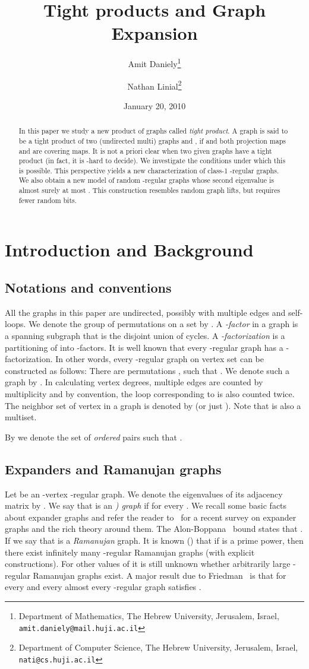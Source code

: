 \documentclass[12pt]{article}
\title{Tight products and Graph Expansion}
\author{
  Amit Daniely\thanks{Department of Mathematics,
    The Hebrew University, Jerusalem, Israel,
    {\tt amit.daniely@mail.huji.ac.il}}
\and
  Nathan Linial\thanks{Department of Computer Science,
    The Hebrew University, Jerusalem, Israel,
    {\tt nati@cs.huji.ac.il}}
}
\date{January 20, 2010}
\newtheorem{open question}[theorem]{Open question}
\begin{document}
 
\maketitle
\begin{abstract}
In this paper we study a new product of graphs called
{\em tight product}. A graph  is said to be a tight product of
two (undirected multi) graphs  and ,
if  and both projection maps 
and  are covering maps. It is not a priori
clear when two given graphs have a tight product (in fact, it
is -hard to decide). We investigate the conditions under which this
is possible. This perspective yields a new
characterization of class-1 -regular graphs.
We also obtain a new model of random -regular graphs whose
second eigenvalue is almost surely at most .
This construction resembles random graph lifts,
but requires fewer random bits.
\end{abstract}


\section{Introduction and Background}
\subsection{Notations and conventions}
All the graphs in this paper are undirected, possibly with
multiple edges and
self-loops. We denote the group of permutations on a set 
by . A {\em -factor} in a graph  is a spanning subgraph
that is the disjoint union of cycles. A {\em -factorization}
is a partitioning of  into -factors. It is well known
\cite{Diestel} that every -regular graph  has a -factorization.
In other words, every -regular graph  on vertex set  can be
constructed as follows: There are  permutations ,
such that .
We denote such a graph by . In calculating vertex degrees, multiple
edges are counted by multiplicity and by convention, the
loop corresponding to  is also counted twice. The neighbor set of
vertex  in a graph  is denoted by  (or just ). Note that  is also a multiset.

By  we denote the set of {\em ordered} pairs  such that .
\subsection{Expanders and Ramanujan graphs}
Let  be an -vertex -regular graph. We denote the eigenvalues of its adjacency matrix by 
. We say that  is
an {\em ) graph} if  for every .
We recall some basic facts about expander graphs and refer the reader to~\cite{HLW06}
for a recent survey on expander graphs and the rich theory around them.
The Alon-Boppana~\cite{alon} bound states that
. If
 we say that  is a {\em Ramanujan} graph.
It is known (\cite{LPS88, Mar88, Mor94}) that if  is a prime power, then there
exist infinitely many -regular Ramanujan graphs (with explicit constructions).
For other values of  it is still unknown whether arbitrarily large -regular Ramanujan graphs exist.
A major result due to Friedman~\cite{Fri} is that for every 
and every  almost every -regular graph satisfies .
\end{document}
